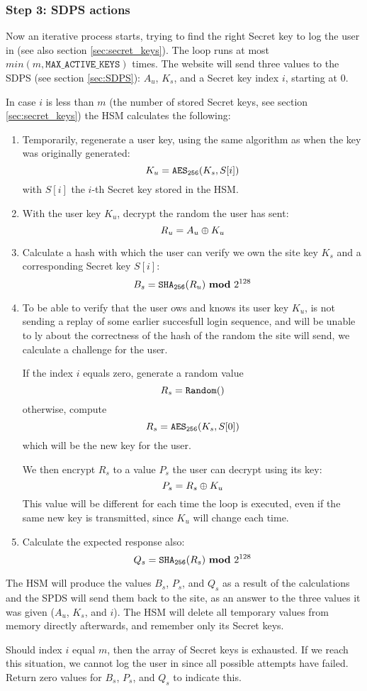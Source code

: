 \subsubsection{Step 3: SDPS actions}
\label{sec:login_step3}
Now an iterative process starts, trying to find the right Secret key to log the user in (see also section \ref{sec:secret_keys}).
The loop runs at most $min(m,\mathtt{MAX\_ACTIVE\_KEYS})$ times.
The website will send three values to the SDPS (see section \ref{sec:SDPS}): $A_u$, $K_s$, and a Secret key index $i$, starting at 0.
\par
In case $i$ is less than $m$
(the number of stored Secret keys, see section \ref{sec:secret_keys})
the HSM calculates the following:
\begin{enumerate}
\item Temporarily, regenerate a user key, using the same algorithm as when the key was originally generated:
\[K_u=\texttt{\ensuremath{\mathtt{AES_{256}}}}(K_s,S[i])\]
with $S[i]$ the $i$-th Secret key stored in the HSM.
\item With the user key $K_u$, decrypt the random the user has sent:
\[R_u=A_u\oplus K_u\]
\item Calculate a hash with which the user can verify we own the site key $K_s$ and a corresponding Secret key $S[i]$:
\[B_s=\texttt{\ensuremath{\mathtt{SHA_{256}}}}(R_u)\ \textbf{mod}\ 2^{128}\]
\item To be able to verify that the user ows and knows its user key $K_u$,
is not sending a replay of some earlier succesfull login sequence,
and will be unable to ly about the correctness of the hash of the random the site will send,
we calculate a challenge for the user.
\par
If the index $i$ equals zero, generate a random value
\[R_s=\texttt{Random}()\]
otherwise, compute
\[R_s=\texttt{\ensuremath{\mathtt{AES_{256}}}}(K_s,S[0])\]
which will be the new key for the user.
\par
We then encrypt $R_s$ to a value $P_s$ the user can decrypt using its key:
\[P_s=R_s\oplus K_u\]
This value will be different for each time the loop is executed,
even if the same new key is transmitted,
since $K_u$ will change each time.
\item Calculate the expected response also:
\[Q_s=\texttt{\ensuremath{\mathtt{SHA_{256}}}}(R_s)\ \textbf{mod}\ 2^{128}\]
\end{enumerate}
The HSM will produce the values $B_s$, $P_s$, and $Q_s$ as a result of the calculations and the SPDS will send them back to the site,
as an answer to the three values it was given ($A_u$, $K_s$, and $i$).
The HSM will delete all temporary values from memory directly afterwards, and remember only its Secret keys.
\par
Should index $i$ equal $m$, then the array of Secret keys is exhausted.
If we reach this situation, we cannot log the user in since all possible attempts have failed.
Return zero values for $B_s$, $P_s$, and $Q_s$ to indicate this.

